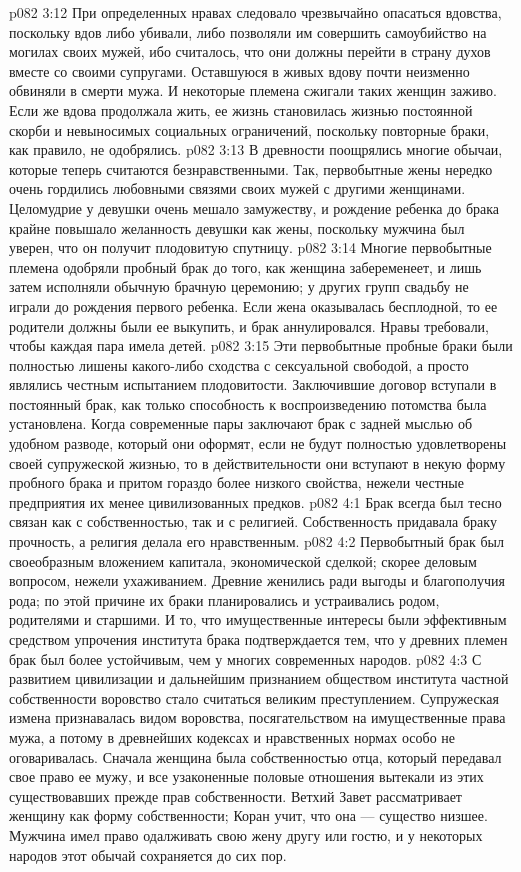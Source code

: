 \vs p082 3:12 \pc При определенных нравах следовало чрезвычайно опасаться вдовства, поскольку вдов либо убивали, либо позволяли им совершить самоубийство на могилах своих мужей, ибо считалось, что они должны перейти в страну духов вместе со своими супругами. Оставшуюся в живых вдову почти неизменно обвиняли в смерти мужа. И некоторые племена сжигали таких женщин заживо. Если же вдова продолжала жить, ее жизнь становилась жизнью постоянной скорби и невыносимых социальных ограничений, поскольку повторные браки, как правило, не одобрялись.
\vs p082 3:13 В древности поощрялись многие обычаи, которые теперь считаются безнравственными. Так, первобытные жены нередко очень гордились любовными связями своих мужей с другими женщинами. Целомудрие у девушки очень мешало замужеству, и рождение ребенка до брака крайне повышало желанность девушки как жены, поскольку мужчина был уверен, что он получит плодовитую спутницу.
\vs p082 3:14 Многие первобытные племена одобряли пробный брак до того, как женщина забеременеет, и лишь затем исполняли обычную брачную церемонию; у других групп свадьбу не играли до рождения первого ребенка. Если жена оказывалась бесплодной, то ее родители должны были ее выкупить, и брак аннулировался. Нравы требовали, чтобы каждая пара имела детей.
\vs p082 3:15 Эти первобытные пробные браки были полностью лишены какого\hyp{}либо сходства с сексуальной свободой, а просто являлись честным испытанием плодовитости. Заключившие договор вступали в постоянный брак, как только способность к воспроизведению потомства была установлена. Когда современные пары заключают брак с задней мыслью об удобном разводе, который они оформят, если не будут полностью удовлетворены своей супружеской жизнью, то в действительности они вступают в некую форму пробного брака и притом гораздо более низкого свойства, нежели честные предприятия их менее цивилизованных предков.
\vs p082 4:1 Брак всегда был тесно связан как с собственностью, так и с религией. Собственность придавала браку прочность, а религия делала его нравственным.
\vs p082 4:2 Первобытный брак был своеобразным вложением капитала, экономической сделкой; скорее деловым вопросом, нежели ухаживанием. Древние женились ради выгоды и благополучия рода; по этой причине их браки планировались и устраивались родом, родителями и старшими. И то, что имущественные интересы были эффективным средством упрочения института брака подтверждается тем, что у древних племен брак был более устойчивым, чем у многих современных народов.
\vs p082 4:3 С развитием цивилизации и дальнейшим признанием обществом института частной собственности воровство стало считаться великим преступлением. Супружеская измена признавалась видом воровства, посягательством на имущественные права мужа, а потому в древнейших кодексах и нравственных нормах особо не оговаривалась. Сначала женщина была собственностью отца, который передавал свое право ее мужу, и все узаконенные половые отношения вытекали из этих существовавших прежде прав собственности. Ветхий Завет рассматривает женщину как форму собственности; Коран учит, что она --- существо низшее. Мужчина имел право одалживать свою жену другу или гостю, и у некоторых народов этот обычай сохраняется до сих пор.
